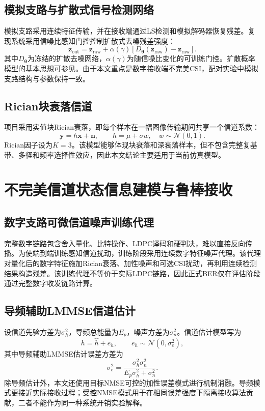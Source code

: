\documentclass[UTF8,a4paper,11pt]{ctexart}
\newcommand{\CSI}{CSI}
\newcommand{\BER}{BER}
\newcommand{\NMSE}{NMSE}
\newcommand{\LDPC}{LDPC}
\begin{document}
\subsection{模拟支路与扩散式信号检测网络}
模拟支路采用连续特征传输，并在接收端通过LS检测和模拟解码器恢复残差。复现系统采用信噪比感知门控控制扩散式去噪残差强度：
\begin{equation}
  \bm z_{\mathrm{out}}
  =\bm z_{\mathrm{raw}}
  +\alpha(\gamma)
  \left[D_{\bm\theta}(\bm z_{\mathrm{raw}})-\bm z_{\mathrm{raw}}\right].
  \label{eq:diff_gate}
\end{equation}
其中$D_{\bm\theta}$为冻结的扩散去噪网络，$\alpha(\gamma)$为随信噪比变化的可训练门控。扩散概率模型的基本思想可参见\cite{ho2020ddpm,nichol2021improved}。由于本文重点是数字接收端不完美\CSI{}，配对实验中模拟支路结构与参数保持一致。

\subsection{Rician块衰落信道}
项目采用实值块Rician衰落，即每个样本在一幅图像传输期间共享一个信道系数：
\begin{equation}
  \bm y=h\bm x+\bm n,
  \qquad
  h=\mu+\sigma w,\quad w\sim\mathcal N(0,1).
  \label{eq:rician}
\end{equation}
Rician因子设为$K=3$。该模型能够体现块衰落和深衰落样本，但不包含完整复基带、多径和频率选择性效应，因此本文结论主要适用于当前仿真模型。

\section{不完美信道状态信息建模与鲁棒接收}
\subsection{数字支路可微信道噪声训练代理}
完整数字链路包含舍入量化、比特操作、\LDPC{}译码和硬判决，难以直接反向传播。为使端到端训练感知信道扰动，训练阶段采用连续数字特征噪声代理。该代理对量化后的数字特征施加Rician衰落、加性噪声和可选\CSI{}扰动，再利用连续检测结果构造残差。该训练代理不等价于实际\LDPC{}链路，因此正式\BER{}仅在评估阶段通过完整数字收发链路计算。

\subsection{导频辅助LMMSE信道估计}
设信道先验方差为$\sigma_h^2$，导频总能量为$E_p$，噪声方差为$\sigma_n^2$。信道估计模型写为
\begin{equation}
  h=\hat h+e_h,
  \qquad
  e_h\sim\mathcal N(0,\sigma_e^2),
  \label{eq:csi_error_model}
\end{equation}
其中导频辅助LMMSE估计误差方差为
\begin{equation}
  \sigma_e^2
  =\frac{\sigma_h^2\sigma_n^2}
  {E_p\sigma_h^2+\sigma_n^2}.
  \label{eq:lmmse_error}
\end{equation}
除导频估计外，本文还使用目标\NMSE{}可控的加性误差模式进行机制消融。导频模式更接近实际接收过程；受控\NMSE{}模式用于在相同误差强度下隔离接收算法贡献，二者不能作为同一种系统开销实验解释。
\end{document}
